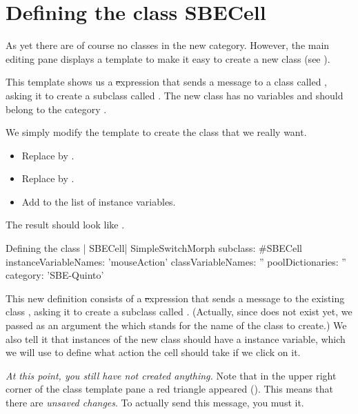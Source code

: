 \documentclass[a4paper,10pt,twoside]{book}
\begin{document}
\section{Defining the class SBECell}

As yet there are  of course no classes in the new category.
However, the main editing pane displays a template to make it easy to create a new class (see ).

This template shows us a \st expression that sends a message to a class called , asking it to create a subclass called .
The new class has no variables and should belong to the category .

We simply modify the template to create the class that we really want.

\begin{itemize}
  \item Replace  by .
  \item Replace  by .
  \item Add  to the list of instance variables.
\end{itemize}
The result should look like .

\begin{classdef}[firstClassDef]{Defining the class \ct| SBECell|}
SimpleSwitchMorph subclass: #SBECell
   instanceVariableNames: 'mouseAction'
   classVariableNames: ''
   poolDictionaries: ''
   category: 'SBE-Quinto'
\end{classdef}

This new definition consists of a \st expression that sends a message to the existing class , asking it to create a subclass called .
(Actually, since  does not exist yet, we passed as an argument the   which stands for the name of the class to create.)
We also tell it that instances of the new class should have a  instance variable, which we will use to define what action the cell should take if we click on it.

\emph{At this point, you still have not created anything.}
Note that in the upper right corner of the class template pane a red triangle appeared ().
This means that there are \emph{unsaved changes}.
To actually send this message, you must  it.
\end{document}
